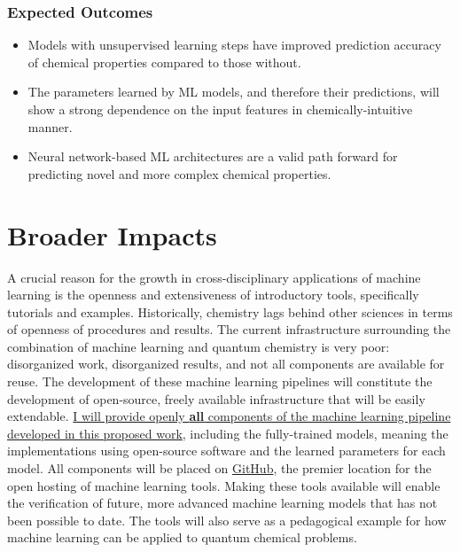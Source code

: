 \documentclass[12pt]{article}
\begin{document}
\subsubsection{Expected Outcomes}
\label{sec:org15d8e88}

\begin{itemize}
\item Models with unsupervised learning steps have improved prediction accuracy of chemical properties compared to those without. 

\item The parameters learned by ML models, and therefore their predictions, will show a strong dependence on the input features in chemically-intuitive manner.
\item Neural network-based ML architectures are a valid path forward for predicting novel and more complex chemical properties.
\end{itemize}

\section{Broader Impacts}
\label{sec:org29a6d7e}

A crucial reason for the growth in cross-disciplinary applications of machine learning is the openness and extensiveness of introductory tools, specifically tutorials and examples. Historically, chemistry lags behind other sciences in terms of openness of procedures and results. The current infrastructure surrounding the combination of machine learning and quantum chemistry is very poor: disorganized work, disorganized results, and not all components are available for reuse. The development of these machine learning pipelines will constitute the development of open-source, freely available infrastructure that will be easily extendable. \uline{I will provide openly \textbf{all} components of the machine learning pipeline developed in this proposed work}, including the fully-trained models, meaning the implementations using open-source software and the learned parameters for each model. All components will be placed on \href{https://github.com/}{GitHub}, the premier location for the open hosting of machine learning tools. Making these tools available will enable the verification of future, more advanced machine learning models that has not been possible to date. The tools will also serve as a pedagogical example for how machine learning can be applied to quantum chemical problems.
\end{document}
